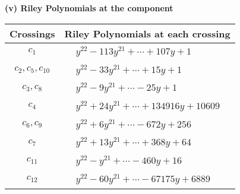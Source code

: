 \documentclass[1p]{elsarticle_modified}
\theoremstyle{definition}
\begin{document}
\newpage\renewcommand{\arraystretch}{1}
\flushleft \textbf{(v) Riley Polynomials at the component}\newline \\
\begin{tabular}{m{50pt}|m{274pt}}
Crossings & \hspace{64pt}Riley Polynomials at each crossing \\
\hline $$\begin{aligned}c_{1}\end{aligned}$$&$\begin{aligned}
&y^{22}-113 y^{21}+\cdots+107 y+1
\end{aligned}$\\
\hline $$\begin{aligned}c_{2},c_{5},c_{10}\end{aligned}$$&$\begin{aligned}
&y^{22}-33 y^{21}+\cdots+15 y+1
\end{aligned}$\\
\hline $$\begin{aligned}c_{3},c_{8}\end{aligned}$$&$\begin{aligned}
&y^{22}-9 y^{21}+\cdots-25 y+1
\end{aligned}$\\
\hline $$\begin{aligned}c_{4}\end{aligned}$$&$\begin{aligned}
&y^{22}+24 y^{21}+\cdots+134916 y+10609
\end{aligned}$\\
\hline $$\begin{aligned}c_{6},c_{9}\end{aligned}$$&$\begin{aligned}
&y^{22}+6 y^{21}+\cdots-672 y+256
\end{aligned}$\\
\hline $$\begin{aligned}c_{7}\end{aligned}$$&$\begin{aligned}
&y^{22}+13 y^{21}+\cdots+368 y+64
\end{aligned}$\\
\hline $$\begin{aligned}c_{11}\end{aligned}$$&$\begin{aligned}
&y^{22}- y^{21}+\cdots-460 y+16
\end{aligned}$\\
\hline $$\begin{aligned}c_{12}\end{aligned}$$&$\begin{aligned}
&y^{22}-60 y^{21}+\cdots-67175 y+6889
\end{aligned}$\\
\hline
\end{tabular}\\~\\
\end{document}
